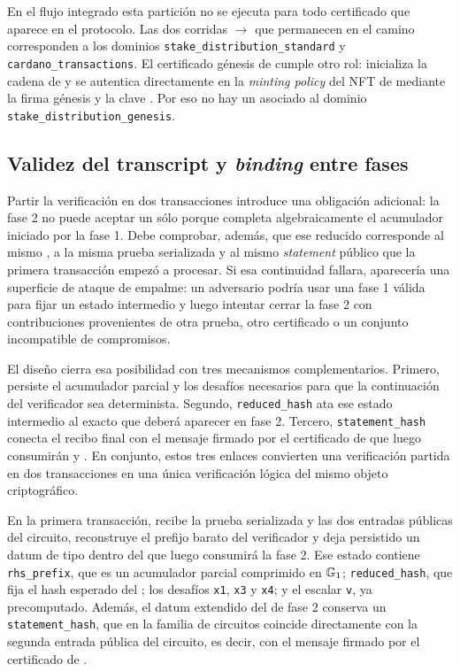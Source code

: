 En el flujo integrado esta partición no se ejecuta para todo certificado que aparece en el protocolo. Las dos corridas \PhaseOneSetupTx $\rightarrow$ \PhaseTwoVerifyTx que permanecen en el camino \Onchain corresponden a los dominios \texttt{stake\_distribution\_standard} y \texttt{cardano\_transactions}. El certificado génesis de \Mithril cumple otro rol: inicializa la cadena de \StakeDistribution y se autentica directamente en la \textit{minting policy} del NFT de \StakeDistribution mediante la firma génesis \GenesisSignature y la clave \GenesisVerificationKey. Por eso no hay un \ProofReceipt asociado al dominio \texttt{stake\_distribution\_genesis}.

\subsection{Validez del transcript y \textit{binding} entre fases}
\label{subsec:mithril-a-cardano-validez-del-transcript-y-binding-entre-fases}
Partir la verificación en dos transacciones introduce una obligación adicional: la fase 2 no puede aceptar un \ReducedRedeemer sólo porque completa algebraicamente el acumulador iniciado por la fase 1. Debe comprobar, además, que ese \redeemer reducido corresponde al mismo \transcript, a la misma prueba serializada y al mismo \textit{statement} público que la primera transacción empezó a procesar. Si esa continuidad fallara, aparecería una superficie de ataque de empalme: un adversario podría usar una fase 1 válida para fijar un estado intermedio y luego intentar cerrar la fase 2 con contribuciones provenientes de otra prueba, otro certificado o un conjunto incompatible de compromisos.

El diseño cierra esa posibilidad con tres mecanismos complementarios. Primero, \PhaseOneState persiste el acumulador parcial y los desafíos necesarios para que la continuación del verificador sea determinista. Segundo, \texttt{reduced\_hash} ata ese estado intermedio al \ReducedRedeemer exacto que deberá aparecer en fase 2. Tercero, \texttt{statement\_hash} conecta el recibo final con el mensaje firmado por el certificado de \Mithril que luego consumirán \StakeDistribution y \MintTx. En conjunto, estos tres enlaces convierten una verificación partida en dos transacciones en una única verificación lógica del mismo objeto criptográfico.

En la primera transacción, \PhaseOneSetupTx recibe la prueba serializada y las dos entradas públicas del circuito, reconstruye el prefijo barato del verificador y deja persistido un datum de tipo \PhaseOneState dentro del \UTxO que luego consumirá la fase 2. Ese estado contiene \texttt{rhs\_prefix}, que es un acumulador parcial comprimido en $\mathbb{G}_1$; \texttt{reduced\_hash}, que fija el hash esperado del \ReducedRedeemer; los desafíos \texttt{x1}, \texttt{x3} y \texttt{x4}; y el escalar \texttt{v}, ya precomputado. Además, el datum extendido del \UTxO de fase 2 conserva un \texttt{statement\_hash}, que en la familia de circuitos \Lagrange coincide directamente con la segunda entrada pública del circuito, es decir, con el mensaje firmado por el certificado de \Mithril.

